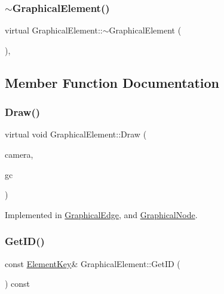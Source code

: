 \subsubsection{\texorpdfstring{$\sim$\+Graphical\+Element()}{~GraphicalElement()}}
{\footnotesize\ttfamily virtual Graphical\+Element\+::$\sim$\+Graphical\+Element (\begin{DoxyParamCaption}{ }\end{DoxyParamCaption})\hspace{0.3cm}{\ttfamily [virtual]}, {\ttfamily [default]}}



\subsection{Member Function Documentation}
\mbox{\label{class_graphical_element_ab137d6d3ad82fd08b5610519dda0c600}} 
\subsubsection{\texorpdfstring{Draw()}{Draw()}}
{\footnotesize\ttfamily virtual void Graphical\+Element\+::\+Draw (\begin{DoxyParamCaption}\item[{const wx\+Affine\+Matrix2D \&}]{camera,  }\item[{wx\+Graphics\+Context $\ast$}]{gc }\end{DoxyParamCaption})\hspace{0.3cm}{\ttfamily [pure virtual]}}



Implemented in \hyperlink{class_graphical_edge_a48170a7fc9e86d92985d694addca8837}{Graphical\+Edge}, and \hyperlink{class_graphical_node_a5675edef9951820c61973cd8fb242287}{Graphical\+Node}.

\mbox{\label{class_graphical_element_a09ed630bc819c852f96ed20dda8d84e8}} 
\subsubsection{\texorpdfstring{Get\+I\+D()}{GetID()}}
{\footnotesize\ttfamily const \hyperlink{_graphical_element_8h_ade5fd6c85839a416577ff9de1605141e}{Element\+Key}\& Graphical\+Element\+::\+Get\+ID (\begin{DoxyParamCaption}{ }\end{DoxyParamCaption}) const\hspace{0.3cm}{\ttfamily [inline]}}



